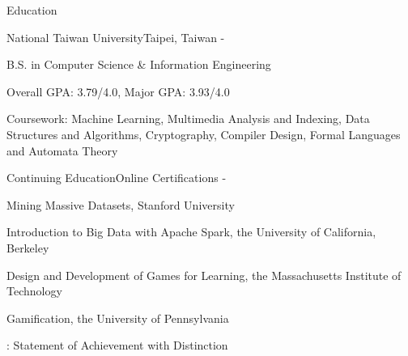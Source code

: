 \documentclass{cv}
\begin{document}
\begin{cvHeader} 
\end{cvHeader}


\begin{cvSection}{Education}

\begin{eduSubsection}{National Taiwan University}{Taipei, Taiwan}{ - }

\item B.S. in Computer Science \& Information Engineering
\item Overall GPA: 3.79/4.0, Major GPA: 3.93/4.0
\item Coursework: Machine Learning, Multimedia Analysis and Indexing, Data Structures and Algorithms, Cryptography, Compiler Design, Formal Languages and Automata Theory
\end{eduSubsection}

\begin{eduSubsection}{Continuing Education}{Online Certifications}{ - }
\item *Mining Massive Datasets, Stanford University %
\item Introduction to Big Data with Apache Spark, the University of California, Berkeley %
\item Design and Development of Games for Learning, the Massachusetts Institute of Technology %
\item Gamification, the University of Pennsylvania %

\hfill {\footnotesize *: Statement of Achievement with Distinction}

\end{eduSubsection}

\end{cvSection}

\end{document}
